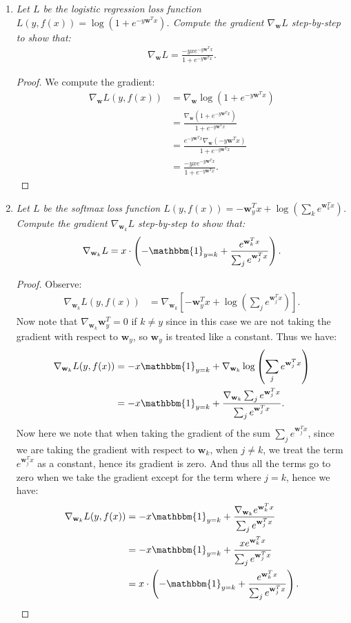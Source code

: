 \documentclass[12pt,oneside,reqno]{amsart}
\theoremstyle{plain}
\theoremstyle{definition}
\theoremstyle{remark}
\newcommand{\vecc}{\mathbf}
\newcommand{\bee}{\begin{equation}\begin{aligned}}
\newcommand{\eee}{\end{aligned}\end{equation}}
\newcommand{\fracc}{\frac}
\newcommand{\lpar}{\left(}
\newcommand{\rpar}{\right)}
\begin{document}
\begin{enumerate}[label=\arabic*.]
\begin{enumerate}
\item \textit{Let $L$ be the logistic regression loss function $L(y,f(x)) = \log\lpar 1 + e^{-y\vecc{w}^Tx} \rpar $. Compute the gradient $\nabla_\vecc{w}L$ step-by-step to show that:
\bee
\nabla_\vecc{w}L = \fracc{-yx e^{-y\vecc{w}^Tx}}{1 + e^{-y\vecc{w}^Tx}}. 
\eee}

\begin{proof}
We compute the gradient:
\bee
\nabla_\vecc{w}L(y,f(x)) &= \nabla_\vecc{w}\log\lpar 1 + e^{-y\vecc{w}^Tx} \rpar\\
&= \fracc{\nabla_\vecc{w}\lpar 1 + e^{-y\vecc{w}^Tx}\rpar}{1 + e^{-y\vecc{w}^Tx}}\\
&= \fracc{e^{-y\vecc{w}^Tx}\nabla_\vecc{w}\lpar -y\vecc{w}^Tx \rpar }{1 + e^{-y\vecc{w}^Tx}}\\
&= \fracc{-yxe^{-y\vecc{w}^Tx} }{1 + e^{-y\vecc{w}^Tx}}.
\eee
\end{proof}

\item \textit{Let $L$ be the softmax loss function $L(y,f(x)) = -\vecc{w}_y^Tx + \log\lpar \sum_k e^{\vecc{w}_k^Tx} \rpar$. Compute the gradient $\nabla_{\vecc{w}_k}L$ step-by-step to show that:
\bee
\nabla_{\vecc{w}_k}L = x\cdot\lpar -\mathbbm{1}_{y = k} + \fracc{e^{\vecc{w}_k^Tx}}{\sum_j e^{\vecc{w}_j^Tx}} \rpar.
\eee}

\begin{proof}
Observe:
\bee
\nabla_{\vecc{w}_k} L(y,f(x)) &= \nabla_{\vecc{w}_k} \left[ 
-\vecc{w}_y^Tx + \log\lpar \sum_j e^{\vecc{w}_j^Tx} \rpar
\right].
\eee
Now note that $\nabla_{\vecc{w}_k} \vecc{w}_y^T = 0$ if $k \neq y$ since in this case we are not taking the gradient with respect to $\vecc{w}_y$, so $\vecc{w}_y$ is treated like a constant. Thus we have:
\bee
\nabla_{\vecc{w}_k} L(y,f(x)) &= -x\mathbbm{1}_{y = k} + \nabla_{\vecc{w}_k} \log\lpar \sum_j e^{\vecc{w}_j^Tx} \rpar\\
&=-x\mathbbm{1}_{y = k} + \fracc{\nabla_{\vecc{w}_k}\sum_j e^{\vecc{w}_j^Tx} }{\sum_j e^{\vecc{w}_j^Tx}}.
\eee
Now here we note that when taking the gradient of the sum $\sum_j e^{\vecc{w}_j^Tx}$, since we are taking the gradient with respect to $\vecc{w}_k$, when $j \neq k$, we treat the term $e^{\vecc{w}_j^Tx}$ as a constant, hence its gradient is zero. And thus all the terms go to zero when we take the gradient except for the term where $j = k$, hence we have:
\bee
\nabla_{\vecc{w}_k} L(y,f(x)) &= -x\mathbbm{1}_{y = k} + \fracc{\nabla_{\vecc{w}_k}e^{\vecc{w}_k^Tx} }{\sum_j e^{\vecc{w}_j^Tx}}\\
&= -x\mathbbm{1}_{y = k} + \fracc{xe^{\vecc{w}_k^Tx} }{\sum_j e^{\vecc{w}_j^Tx}}\\
&= x\cdot \lpar -\mathbbm{1}_{y = k} + \fracc{e^{\vecc{w}_k^Tx} }{\sum_j e^{\vecc{w}_j^Tx}} \rpar.
\eee
\end{proof}
\end{enumerate}


\end{enumerate}
\end{document}
